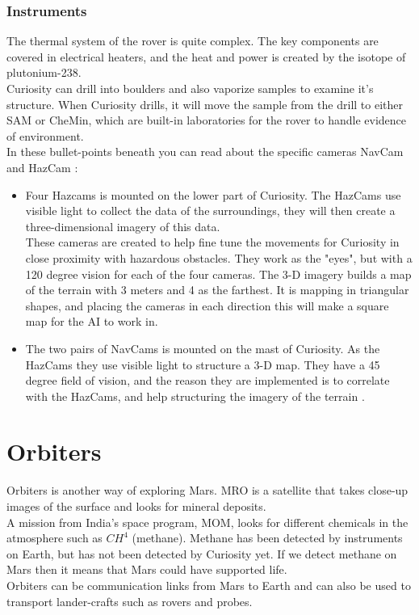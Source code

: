 \subsubsection{Instruments}

The thermal system of the rover is quite complex. The key components are covered in electrical heaters, and the heat and power is created by the isotope of plutonium-238.\\
Curiosity can drill into boulders and also vaporize samples to examine it's structure. When Curiosity drills, it will move the sample from the drill to either SAM or CheMin, which are built-in laboratories for the rover to handle evidence of environment.\\
In these bullet-points beneath you can read about the specific cameras NavCam and HazCam \cite{CuriosityNASA}\cite{CuriosityPOWER}: 

\begin{itemize}
\item Four Hazcams is mounted on the lower part of Curiosity. The HazCams use visible light to collect the data of the surroundings, they will then create a three-dimensional imagery of this data.\\ These cameras are created to help fine tune the movements for Curiosity in close proximity with hazardous obstacles. They work as the "eyes", but with a 120 degree vision for each of the four cameras. The 3-D imagery builds a map of the terrain with 3 meters and 4 as the farthest. It is mapping in triangular shapes, and placing the cameras in each direction this will make a square map for the AI to work in\cite{CuriosityVision}. 
\item The two pairs of NavCams is mounted on the mast of Curiosity. As the HazCams they use visible light to structure a 3-D map. They have a 45 degree field of vision, and the reason they are implemented is to correlate with the HazCams, and help structuring the imagery of the terrain \cite{CuriosityVision}. 
\end{itemize}



\section{Orbiters}
Orbiters is another way of exploring Mars. MRO is a satellite that takes close-up images of the surface and looks for mineral deposits. \\
A mission from India's space program, MOM, looks for different chemicals in the atmosphere such as \begin{math}CH^4\end{math} (methane). Methane has been detected by instruments on Earth, but has not been detected by Curiosity yet. If we detect methane on Mars then it means that Mars could have supported life.\\  Orbiters can be communication links from Mars to Earth and can also be used to transport lander-crafts such as rovers and probes\cite{orbitermro}.

